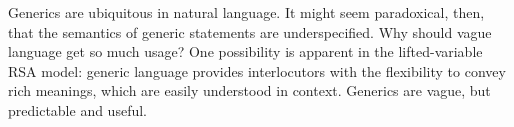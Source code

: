\documentclass[10pt,letterpaper]{article}
\begin{document}
Generics are ubiquitous in natural language. It might seem paradoxical, then, that the semantics of generic statements are underspecified. Why should vague language get so much usage? One possibility is apparent in the lifted-variable RSA model: generic language provides interlocutors with the flexibility to convey rich meanings, which are easily understood in context. 
Generics are vague, but predictable and useful.



%

%
 
\end{document}

